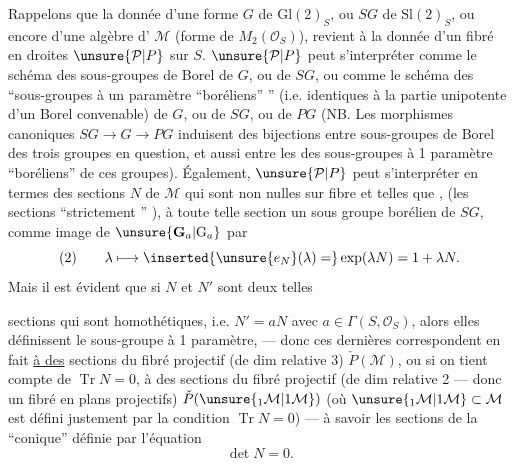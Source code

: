 Rappelons que la donnée  d'une forme $G$ de $\mathrm{Gl}(2)_S$, ou $SG$ de $\mathrm{Sl}(2)_S$,  ou encore d'une algèbre d' $\mathcal M$ (forme de $M_2(\mathcal O_S)$), revient à la donnée d'un fibré en droites  $\unsure{\mathcal P|P}$ sur $S$.
$\unsure{\mathcal P|P}$ peut s'interpréter comme le schéma des sous-groupes de Borel  de $G$, ou  de $SG$,  ou comme le schéma des ``sous-groupes  à un paramètre ``boréliens'' '' (i.e. identiques à la partie unipotente d'un Borel convenable)  de $G$, ou de $SG$, ou de $PG$ (NB. Les morphismes canoniques $SG\longrightarrow G\longrightarrow PG$ induisent des bijections entre  sous-groupes de Borel des trois groupes en question, et aussi entre les  des sous-groupes à 1 paramètre ``boréliens'' de ces groupes).
Également, $\unsure{\mathcal P|P}$ peut s'interpréter en termes des sections $N$  de $\mathcal M$ qui sont non nulles sur  fibre et telles que ,
\inserted{\[
(1)\qquad\det N=0,\quad\operatorname{Tr}N=0\qquad\text{d'où }N^2=0
\]}
(les sections ``strictement '' ), à toute telle section  un sous groupe  borélien de $SG$, comme image de $\unsure{\mathbf G_a|\mathrm G_a}$ par
\[
(2)\qquad\lambda\longmapsto\inserted{\unsure{e_N}(\lambda)=}\exp(\lambda N)=1+\lambda N.
\]
Mais il est évident que si $N$ et $N'$ sont deux telles



sections qui sont homothétiques, i.e. $N'=aN$ avec $a\in\Gamma(S,\mathcal O_S)$,  alors elles définissent le  sous-groupe à 1 paramètre, --- donc ces dernières correspondent en fait \uline{à des} sections du fibré projectif (de dim relative 3) $\check P(\mathcal M)$, ou si on tient compte de $\operatorname{Tr}N=0$,  à des sections du fibré projectif (de dim relative 2 --- donc un fibré en plans projectifs) $\check P(\unsure{{}_1\mathcal M|1\mathcal M})$ (où $\unsure{{}_1\mathcal M|1\mathcal M}\subset\mathcal M$ est défini justement par la condition $\operatorname{Tr}N=0$) --- à savoir les sections de la  ``conique'' définie par l'équation
\[
\det N=0.
\]


